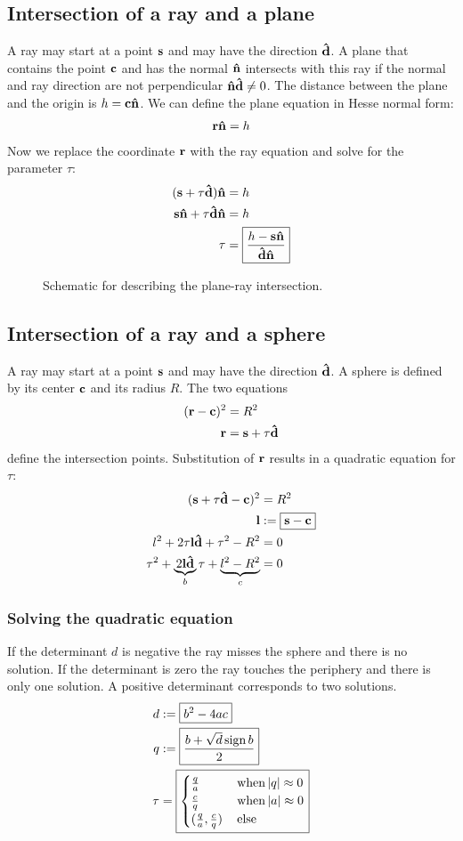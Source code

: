 \documentclass[twocolumn,DIV19]{scrartcl}
\DeclareMathOperator{\sign}{sign}
\begin{document}
\subsection{Intersection of a ray and a plane}
A ray may start at a point $\mathbf{s}$ and may have the direction $\mathbf{\hat{d}}$.  A
plane that contains the point $\mathbf{c}$ and has the normal $\mathbf{\hat{n}}$ intersects
with this ray if the normal and ray direction are not perpendicular
$\mathbf{\hat{n}}\mathbf{\hat{d}}\not=0$. The distance between the plane and the origin is
$h=\mathbf{c}\mathbf{\hat{n}}$. We can define the plane equation in Hesse normal form:  
\begin{align}
  \mathbf{r}\mathbf{\hat{n}}=h
\end{align}
Now we replace the coordinate $\mathbf{r}$ with the ray equation and solve for
the parameter $\tau$:
\begin{align}
  (\mathbf{s}+\tau\mathbf{\hat{d}})\mathbf{\hat{n}}&=h\\
  \mathbf{s}\mathbf{\hat{n}}+\tau\mathbf{\hat{d}}\mathbf{\hat{n}}&=h\\
  \tau&=\boxed{\frac{h-\mathbf{s}\mathbf{\hat{n}}}{\mathbf{\hat{d}}\mathbf{\hat{n}}}}
\end{align}
 \begin{figure}[!hbt]
   \centering
   
   \caption{Schematic for describing the plane-ray intersection.}
 \end{figure}
\subsection{Intersection of a ray and a sphere}
A ray may start at a point $\mathbf{s}$ and may have the direction $\mathbf{\hat{d}}$.  A
sphere is defined by its center $\mathbf{c}$ and its radius $R$.  The two
equations
\begin{align}
  (\mathbf{r}-\mathbf{c})^2&=R^2\\
  \mathbf{r}&=\mathbf{s}+\tau\mathbf{\hat{d}}
\end{align}
define the intersection points. Substitution of $\mathbf{r}$ results in a
quadratic equation for $\tau$:
\begin{align}
  (\mathbf{s}+\tau\mathbf{\hat{d}}-\mathbf{c})^2&=R^2\\
  \mathbf{l}&:=\boxed{\mathbf{s}-\mathbf{c}}\\
  l^2+2\tau\mathbf{l}\mathbf{\hat{d}}+\tau^2-R^2&=0\\
  \tau^2+\underbrace{2\mathbf{l}\mathbf{\hat{d}}}_b\tau+\underbrace{l^2-R^2}_c&=0
\end{align}
\subsubsection{Solving the quadratic equation}
If the determinant $d$ is negative the ray misses the sphere and there
is no solution. If the determinant is zero the ray touches the
periphery and there is only one solution. A positive determinant
corresponds to two solutions.
\begin{align}
  d&:=\boxed{b^2-4ac}\\
  q&:=\boxed{\frac{b+\sqrt{d}\sign b}{2}}\\
  \tau&=\boxed{
  \begin{cases}
    \frac{q}{a} &\,\textrm{when}\,\abs{q}\approx 0\\ 
    \frac{c}{q} &\,\textrm{when}\,\abs{a}\approx 0\\
    (\frac{q}{a}, \frac{c}{q}) &\,\textrm{else}
  \end{cases}}
\end{align}
\end{document}
